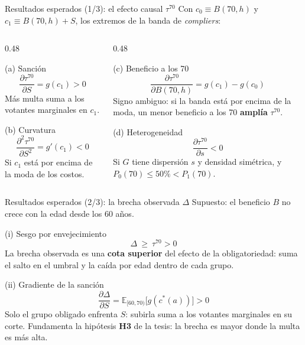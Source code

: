 \documentclass[aspectratio=169,11pt,xcolor=table]{beamer}
\newcommand{\hl}[1]{\textcolor{upaccent}{\textbf{#1}}}
\begin{document}
\begin{frame}{Resultados esperados (1/3): el efecto causal $\tau^{70}$}
  \footnotesize Con $c_0\equiv B(70,h)$ y $c_1\equiv B(70,h)+S$, los extremos de la banda de \textit{compliers}:
  \vspace{0.1cm}
  \begin{columns}[T]
    \begin{column}{0.48\textwidth}
      \begin{block}{(a) Sanción}
        \[ \frac{\partial\tau^{70}}{\partial S}=g(c_1)>0 \]
        \footnotesize Más multa suma a los votantes marginales en $c_1$.
      \end{block}
      \vspace{0.1cm}
      \begin{block}{(b) Curvatura}
        \[ \frac{\partial^2\tau^{70}}{\partial S^2}=g'(c_1)<0 \]
        \footnotesize Si $c_1$ está por encima de la moda de los costos.
      \end{block}
    \end{column}
    \begin{column}{0.48\textwidth}
      \begin{block}{(c) Beneficio a los 70}
        \[ \frac{\partial\tau^{70}}{\partial B(70,h)}=g(c_1)-g(c_0) \]
        \footnotesize Signo ambiguo: si la banda está por encima de la moda, un menor beneficio a los 70 \textbf{amplía} $\tau^{70}$.
      \end{block}
      \vspace{0.1cm}
      \begin{block}{(d) Heterogeneidad}
        \[ \frac{\partial\tau^{70}}{\partial s}<0 \]
        \footnotesize Si $G$ tiene dispersión $s$ y densidad simétrica, y $P_0(70)\le 50\%<P_1(70)$.
      \end{block}
    \end{column}
  \end{columns}
\end{frame}

\begin{frame}{Resultados esperados (2/3): la brecha observada $\Delta$}
  \small Supuesto: el beneficio $B$ no crece con la edad desde los 60 años.
  \vspace{0.2cm}
  \begin{block}{(i) Sesgo por envejecimiento}
    \[ \Delta\ \ge\ \tau^{70}>0 \]
    \footnotesize La brecha observada es una \textbf{cota superior} del efecto de la obligatoriedad: suma el salto en el umbral y la caída por edad dentro de cada grupo.
  \end{block}
  \vspace{0.15cm}
  \begin{block}{(ii) Gradiente de la sanción}
    \[ \frac{\partial\Delta}{\partial S}=\mathbb E_{[60,70)}\big[g(c^*(a))\big]>0 \]
    \footnotesize Solo el grupo obligado enfrenta $S$: subirla suma a los votantes marginales en su corte. Fundamenta la hipótesis \hl{H3} de la tesis: la brecha es mayor donde la multa es más alta.
  \end{block}
\end{frame}
\end{document}
